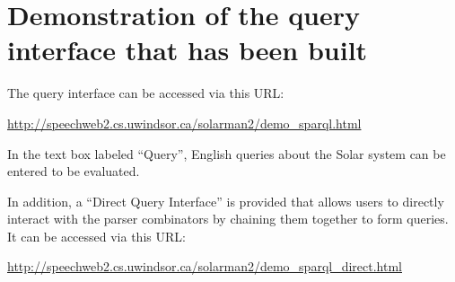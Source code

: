 \documentclass[../main.tex]{subfiles}
\begin{document}
\chapter{Demonstration of the query interface that has been built}

The query interface can be accessed via this URL:

\url{http://speechweb2.cs.uwindsor.ca/solarman2/demo_sparql.html}


In the text box labeled ``Query'', English queries about the Solar system can be entered to be evaluated.

In addition, a ``Direct Query Interface'' is provided that allows users to directly interact with the parser combinators by chaining them together to form queries.  It can be accessed via this URL:

\url{http://speechweb2.cs.uwindsor.ca/solarman2/demo_sparql_direct.html}
\end{document}
